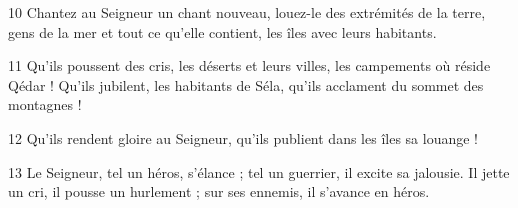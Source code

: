 
10 Chantez au Seigneur un chant nouveau, louez-le des extrémités de la terre, gens de la mer et tout ce qu’elle contient, les îles avec leurs habitants.

11 Qu’ils poussent des cris, les déserts et leurs villes, les campements où réside Qédar ! Qu’ils jubilent, les habitants de Séla, qu’ils acclament du sommet des montagnes !

12 Qu’ils rendent gloire au Seigneur, qu’ils publient dans les îles sa louange !

13 Le Seigneur, tel un héros, s’élance ; tel un guerrier, il excite sa jalousie. Il jette un cri, il pousse un hurlement ; sur ses ennemis, il s’avance en héros.